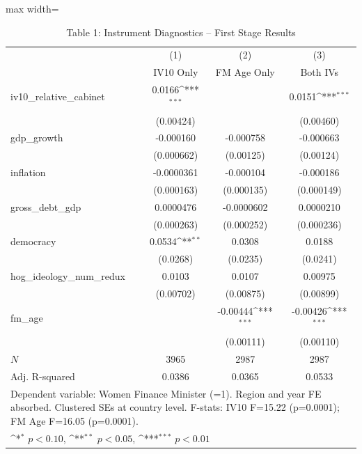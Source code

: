 \begin{table}[htbp]\centering
\def\sym#1{\ifmmode^{#1}\else\(^{#1}\)\fi}
\caption{Table 1: Instrument Diagnostics -- First Stage Results}
\begin{adjustbox}{max width=\textwidth}
\small
\begin{tabular}{l*{3}{c}}
\hline\hline
            &\multicolumn{1}{c}{(1)}&\multicolumn{1}{c}{(2)}&\multicolumn{1}{c}{(3)}\\
            &\multicolumn{1}{c}{IV10 Only}&\multicolumn{1}{c}{FM Age Only}&\multicolumn{1}{c}{Both IVs}\\
\hline
iv10\_relative\_cabinet&      0.0166\sym{***}&                     &      0.0151\sym{***}\\
            &   (0.00424)         &                     &   (0.00460)         \\
[1em]
gdp\_growth  &   -0.000160         &   -0.000758         &   -0.000663         \\
            &  (0.000662)         &   (0.00125)         &   (0.00124)         \\
[1em]
inflation   &  -0.0000361         &   -0.000104         &   -0.000186         \\
            &  (0.000163)         &  (0.000135)         &  (0.000149)         \\
[1em]
gross\_debt\_gdp&   0.0000476         &  -0.0000602         &   0.0000210         \\
            &  (0.000263)         &  (0.000252)         &  (0.000236)         \\
[1em]
democracy   &      0.0534\sym{**} &      0.0308         &      0.0188         \\
            &    (0.0268)         &    (0.0235)         &    (0.0241)         \\
[1em]
hog\_ideology\_num\_redux&      0.0103         &      0.0107         &     0.00975         \\
            &   (0.00702)         &   (0.00875)         &   (0.00899)         \\
[1em]
fm\_age      &                     &    -0.00444\sym{***}&    -0.00426\sym{***}\\
            &                     &   (0.00111)         &   (0.00110)         \\
\hline
\(N\)       &        3965         &        2987         &        2987         \\
Adj. R-squared&      0.0386         &      0.0365         &      0.0533         \\
\hline\hline
\multicolumn{4}{l}{\footnotesize Dependent variable: Women Finance Minister (=1).  Region and year FE absorbed. Clustered SEs at country level.  F-stats: IV10 F=15.22 (p=0.0001); FM Age F=16.05 (p=0.0001).}\\
\multicolumn{4}{l}{\footnotesize \sym{*} \(p<0.10\), \sym{**} \(p<0.05\), \sym{***} \(p<0.01\)}\\
\end{tabular}
\end{adjustbox}
\end{table}
